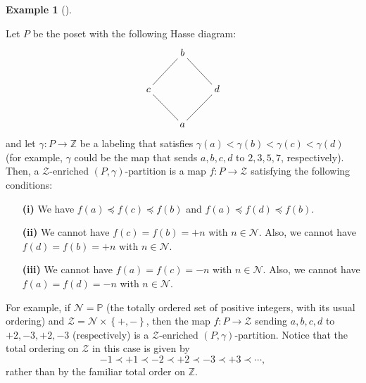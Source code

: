\documentclass[numbers=enddot,12pt,final,onecolumn,notitlepage]{scrartcl}%
\makeatletter
\theoremstyle{definition}
\newtheorem{exmp}[theo]{Example}
\newenvironment{example}[1][]
{\begin{exmp}[#1]\begin{leftbar}}
{\end{leftbar}\end{exmp}}
\newcommand{\are}{\ar@{-}}
\makeatother
\begin{document}
\begin{example}
\label{exa.ambivPp.diamond}Let $P$ be the poset with the following Hasse
diagram:%
\[%
\xymatrix{
& b \are[dl] \are[dr] \\
c \are[dr] & & d \are[dl] \\
& a
}%
\]
and let $\gamma:P\rightarrow\mathbb{Z}$ be a labeling that satisfies
$\gamma\left(  a\right)  <\gamma\left(  b\right)  <\gamma\left(  c\right)
<\gamma\left(  d\right)  $ (for example, $\gamma$ could be the map that sends
$a,b,c,d$ to $2,3,5,7$, respectively). Then, a $\mathcal{Z}$-enriched $\left(
P,\gamma\right)  $-partition is a map $f:P\rightarrow\mathcal{Z}$ satisfying
the following conditions:

\begin{enumerate}
\item[\textbf{(i)}] We have $f\left(  a\right)  \preccurlyeq f\left(
c\right)  \preccurlyeq f\left(  b\right)  $ and $f\left(  a\right)
\preccurlyeq f\left(  d\right)  \preccurlyeq f\left(  b\right)  $.

\item[\textbf{(ii)}] We cannot have $f\left(  c\right)  =f\left(  b\right)
=+n$ with $n\in\mathcal{N}$. Also, we cannot have $f\left(  d\right)
=f\left(  b\right)  =+n$ with $n\in\mathcal{N}$.

\item[\textbf{(iii)}] We cannot have $f\left(  a\right)  =f\left(  c\right)
=-n$ with $n\in\mathcal{N}$. Also, we cannot have $f\left(  a\right)
=f\left(  d\right)  =-n$ with $n\in\mathcal{N}$.
\end{enumerate}

For example, if $\mathcal{N}=\mathbb{P}$ (the totally ordered set of positive
integers, with its usual ordering) and $\mathcal{Z}=\mathcal{N}\times\left\{
+,-\right\}  $, then the map $f:P\rightarrow\mathcal{Z}$ sending $a,b,c,d$ to
$+2,-3,+2,-3$ (respectively) is a $\mathcal{Z}$-enriched $\left(
P,\gamma\right)  $-partition. Notice that the total ordering on $\mathcal{Z}$
in this case is given by%
\[
-1\prec+1\prec-2\prec+2\prec-3\prec+3\prec\cdots,
\]
rather than by the familiar total order on $\mathbb{Z}$.
\end{example}
\end{document}
